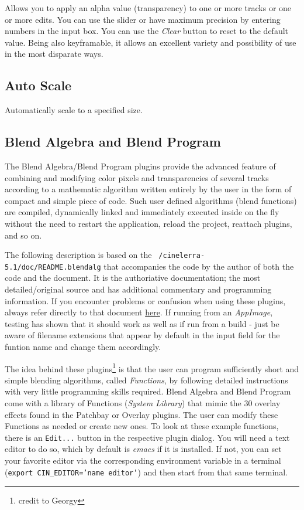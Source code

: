 Allows you to apply an alpha value (transparency) to one or more tracks or one or more edits. You can use the slider or have maximum precision by entering numbers in the input box. You can use the \textit{Clear} button to reset to the default value. Being also keyframable, it allows an excellent variety and possibility of use in the most disparate ways.

\subsection{Auto Scale}%
\label{sub:auto_scale}

Automatically scale to a specified size.

\subsection{Blend Algebra and Blend Program}%
\label{sub:blend_algebra}

The Blend Algebra/Blend Program plugins provide the advanced feature of combining and modifying color pixels and transparencies of several tracks according to a mathematic algorithm written entirely by the user in the form of compact and simple piece of code. Such user defined algorithms (blend functions) are compiled, dynamically linked and immediately executed inside \CGG{} on the fly without the need to restart the application, reload the project, reattach plugins, and so on.

The following description is based on the \texttt{~/cinelerra-5.1/doc/README.blendalg} that accompanies the code by the author of both the code and the document.  It is the authoriative documentation; the most detailed/original source and has additional commentary and programming information. If you encounter problems or confusion when using these plugins, always refer directly to that document \href{https://download.cinelerra-gg.org/download.php?file=testing\%2FBlendPluginExamples/README.blendalg}{here}.  If running \CGG{} from an \textit{AppImage}, testing has shown that it should work  as well as if run from a build - just be aware of filename extensions that appear by default in the input field for the funtion name and change them accordingly.

The idea behind these plugins\protect\footnote{credit to Georgy} is that the user can program sufficiently short and simple blending algorithms, called \textit{Functions}, by following detailed instructions with very little programming skills required.
Blend Algebra and Blend Program come with a library of Functions (\textit{System Library}) that mimic the 30 overlay effects found in the Patchbay or Overlay plugins. The user can modify these Functions as needed or create new ones.
To look at these example functions, there is an \texttt{Edit...} button in the respective plugin dialog. You will need a text editor to do so, which by default is \textit{emacs} if it is installed. If not, you can set your favorite editor via the corresponding environment variable in a terminal (\texttt{export CIN\_EDITOR='name editor'}) and then start \CGG{} from that same terminal.

